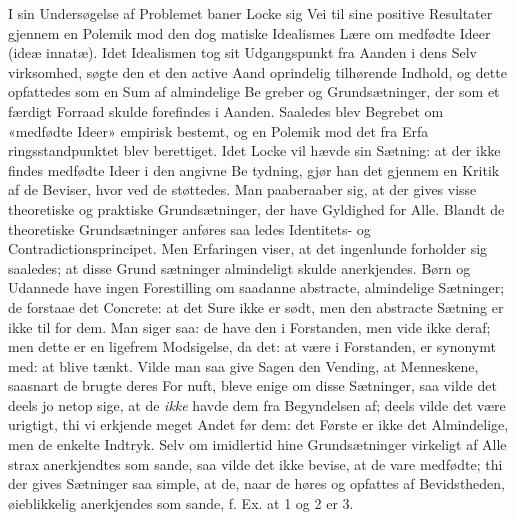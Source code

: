 \documentclass[12pt,a4paper]{book}
\begin{document}
I sin Undersøgelse af Problemet baner Locke sig Vei til
sine positive Resultater gjennem en Polemik mod den dog\-%
matiske Idealismes Lære om medfødte Ideer (ideæ innatæ).
Idet Idealismen tog sit Udgangspunkt fra Aanden i dens Selv\-%
virksomhed, søgte den et den active Aand oprindelig tilhørende
Indhold, og dette opfattedes som en Sum af almindelige Be\-%
greber og Grundsætninger, der som et færdigt Forraad skulde
forefindes i Aanden. Saaledes blev Begrebet om «medfødte
Ideer» empirisk bestemt, og en Polemik mod det fra Erfa\-%
ringsstandpunktet blev berettiget. Idet Locke vil hævde sin
Sætning: at der ikke findes medfødte Ideer i den angivne Be\-%
tydning, gjør han det gjennem en Kritik af de Beviser, hvor\-%
ved de støttedes. Man paaberaaber sig, at der gives visse
theoretiske og praktiske Grundsætninger, der have Gyldighed
for Alle. Blandt de theoretiske Grundsætninger anføres saa\-%
ledes Identitets- og Contradictionsprincipet. Men Erfaringen
viser, at det ingenlunde forholder sig saaledes; at disse Grund\-%
sætninger almindeligt skulde anerkjendes. Børn og Udannede
have ingen Forestilling om saadanne abstracte, almindelige
Sætninger; de forstaae det Concrete: at det Sure ikke er sødt,
men den abstracte Sætning er ikke til for dem. Man siger
saa: de have den i Forstanden, men vide ikke deraf; men
dette er en ligefrem Modsigelse, da det: at være i Forstanden,
er synonymt med: at blive tænkt. Vilde man saa give Sagen
den Vending, at Menneskene, saasnart de brugte deres For\-%
nuft, bleve enige om disse Sætninger, saa vilde det deels jo
netop sige, at de \emph{ikke} havde dem fra Begyndelsen af; deels
vilde det være urigtigt, thi vi erkjende meget Andet før dem:
det Første er ikke det Almindelige, men de enkelte Indtryk.
Selv om imidlertid hine Grundsætninger virkeligt af Alle strax
anerkjendtes som sande, saa vilde det ikke bevise, at de vare
medfødte; thi der gives Sætninger saa simple, at de, naar de
høres og opfattes af Bevidstheden, øieblikkelig anerkjendes som
sande, f. Ex. at 1 og 2 er 3.
\end{document}
